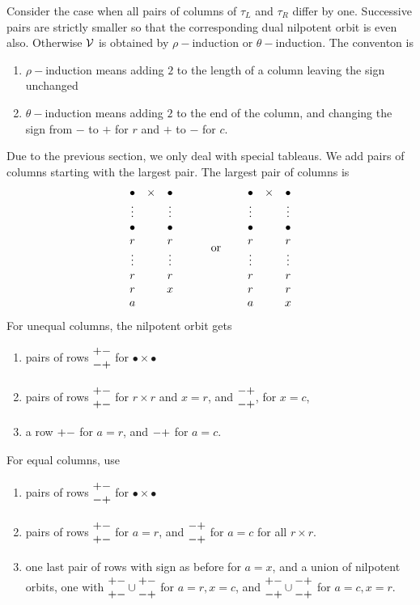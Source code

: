 \documentclass[11pt ,reqno]{amsart}
\begin{document}
Consider the case when all pairs of columns of $\tau_L$ and $\tau_R$
differ by one. Successive pairs are strictly smaller so that the
corresponding dual nilpotent orbit is even also. Otherwise ${\mathcal V}$ is
obtained by $\rho-$induction or $\theta-$induction. The conventon is
\begin{enumerate}
\item $\rho-$induction means adding $2$ to the length of a  column
  leaving the sign unchanged
\item $\theta-$induction means adding $2$ to the end of the column,
  and changing the sign from $-$ to $+$ for $r$ and $+$ to $-$ for $c.$
\end{enumerate}
Due to the previous section, we only deal with special tableaus. We
add pairs of columns  starting with the  largest pair. The largest
pair of columns is 
$$
\begin{aligned}
&\begin{matrix}
\bullet &\times &\bullet\\
\vdots & &\vdots\\
\bullet & &\bullet\\
r&   &r\\
\vdots & &\vdots\\
r& &r\\
r& &x\\
a & &
\end{matrix} &\qquad\text{ or } \qquad
\begin{matrix}
\bullet &\times &\bullet\\
\vdots & &\vdots\\
\bullet & &\bullet\\
r&   &r\\
\vdots & &\vdots\\
r& &r\\
r& &r\\
a && x
\end{matrix}
\end{aligned}
$$
For unequal columns, the nilpotent orbit gets
\begin{enumerate}
\item pairs of rows $\begin{matrix} +-\\ -+\end{matrix}$ for $\bullet\times\bullet$
\item pairs of rows $\begin{matrix} +-\\+-\end{matrix}$ for $r\times r$ and $x=r$, and $\begin{matrix} -+\\-+\end{matrix}$,   for $x=c$,
\item a row $\begin{matrix} +-\end{matrix}$ for $a=r$, and $\begin{matrix} -+\end{matrix}$ for $a=c$.
\end{enumerate}
For equal columns, use
\begin{enumerate}
\item pairs of rows $\begin{matrix}+-\\-+\end{matrix}$ for $\bullet\times\bullet$
\item pairs of rows $\begin{matrix} +-\\+-\end{matrix}$ for $a=r$, and $\begin{matrix}-+\\-+\end{matrix}$  for $a=c$ for all $r\times r$.
\item one last pair of rows with sign as before for $a=x$, and a union of nilpotent orbits, one with $\begin{matrix} +-\\+-\end{matrix}\cup\begin{matrix} +-\\-+\end{matrix}$ for $a=r, x=c$, and $\begin{matrix} +-\\-+\end{matrix}\cup\begin{matrix} -+\\-+\end{matrix}$ for $a=c, x=r.$
\end{enumerate}
\end{document}
